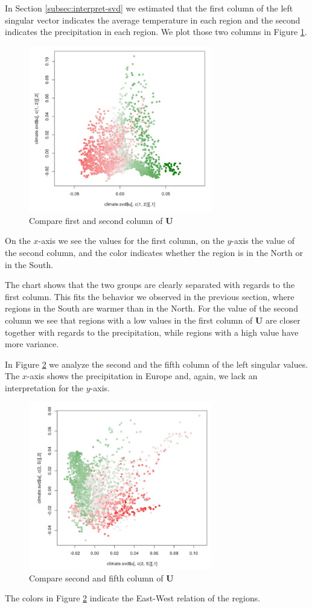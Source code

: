 \documentclass{support/acm_proc_article-sp}
\begin{document}
    In Section \ref{subsec:interpret-svd} we estimated that the first column of the left singular vector indicates
    the average temperature in each region and the second indicates the precipitation in each region.
    We plot those two columns in Figure \ref{fig:2d-1}.
    \begin{figure}[!htbp]
        \centering
        \includegraphics[width=8cm]{images/2d-1.png}
        \caption{Compare first and second column of $\mathbf{U}$}
        \label{fig:2d-1}
    \end{figure}
    On the $x$-axis we see the values for the first column, on the $y$-axis the value of the second column, and the
    color indicates whether the region is in the North or in the South.

    The chart shows that the two groups are clearly separated with regards to the first column.
    This fits the behavior we observed in the previous section, where regions in the South are warmer than in the North.
    For the value of the second column we see that regions with a low values in the first column of $\mathbf{U}$ are
    closer together with regards to the precipitation, while regions with a high value have more variance.

    In Figure \ref{fig:2d-2} we analyze the second and the fifth column of the left singular values.
    The $x$-axis shows the precipitation in Europe and, again, we lack an interpretation for the $y$-axis.
    \begin{figure}[!htbp]
        \centering
        \includegraphics[width=8cm]{images/2d-2.png}
        \caption{Compare second and fifth column of $\mathbf{U}$}
        \label{fig:2d-2}
    \end{figure}
    The colors in Figure \ref{fig:2d-2} indicate the East-West relation of the regions.
\end{document}
